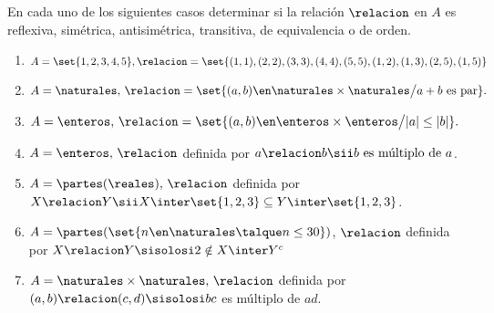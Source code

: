 \def\veintidosi{
  \begin{tikzpicture}[baseline=0, >=Latex, draw=Aquamarine,scale=0.7, transform shape]

    \node[] (1) {$\bullet$};
    \node[] at (1.west) {$1$};

    \node[above right= of 1] (2) {$\bullet$};
    \node[] at (2.east) {$2$};

    \node[below right= of 2] (3) {$\bullet$};
    \node[] at (3.east) {$3$};

    \node[below= of 1] (4) {$\bullet$};
    \node[] at (4.west) {$4$};

    \node[right= of 2] (5) {$\bullet$};
    \node[] at (5.west) {$5$};

    \node[shape=ellipse, draw, black, fit={ (1) (2) (3) (4)}] (universo) {};
    \node[above left = 0.1em of universo] {$A$};

    \draw[->, loop below] (1) to (1);
    \draw[->, loop left] (2) to (2);
    \draw[->, loop above] (3) to (3);
    \draw[->, loop above] (4) to (4);
    \draw[->, loop right] (5) to (5);

    \draw[->, bend right] (1.center) to (2);
    \draw[->, bend right] (1.center) to (3);
    \draw[->, bend right] (1.center) to (5);

    \draw[->, bend left] (2.center) to (5);
  \end{tikzpicture}
}
\begin{enunciado}{\ejercicio}
  En cada uno de los siguientes casos determinar si la relación $\relacion $ en $A$ es reflexiva, simétrica,
  antisimétrica, transitiva, de equivalencia o de orden.
  \begin{enumerate}[label=\roman*)]
    \item $A = \set{1,2,3,4,5}, \relacion = \set{(1,1), (2,2), (3,3), (4,4), (5,5), (1,2), (1,3), (2,5), (1,5)}$
    \item $A = \naturales,\, \relacion = \set{(a,b) \en \naturales \times \naturales \big/ a+b \text{ es par} }.$
    \item $A = \enteros,\, \relacion = \set{(a,b) \en \enteros \times \enteros \big/ |a| \leq |b| }.$
    \item $A = \enteros,\, \relacion$ definida por $a \relacion b \sii b \text{ es múltiplo de } a$.
    \item $A = \partes(\reales),\, \relacion$ definida por $X \relacion Y \sii X \inter \set{1,2,3} \subseteq Y \inter \set{1,2,3}$.
    \item $A = \partes(\set{n \en \naturales \talque n \leq 30})$, $\relacion$ definida por $X \relacion Y \sisolosi 2 \notin X \inter Y^c$
    \item $A = \naturales \times \naturales,\, \relacion$ definida por $(a,b) \relacion (c,d) \sisolosi bc$ es múltiplo de $ad$.
  \end{enumerate}

\end{enunciado}


